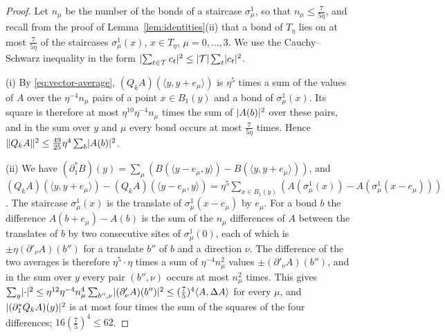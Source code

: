 \documentclass[11pt]{preprint}
\DeclarePairedDelimiter{\abs}{\lvert}{\rvert}
\DeclarePairedDelimiter{\norm}{\lVert}{\rVert}
\numberwithin{equation}{section}
\theoremstyle{definition}
\theoremstyle{remark}
\theoremstyle{plain}
\begin{document}
\begin{proof}
Let $n_\mu$ be the number of the bonds of a staircase $\sigma^1_\mu$, so that $n_\mu \leq \frac{7}{5\eta}$, and recall from the proof of Lemma~\ref{lem:identities}(ii) that a bond of $T_\eta$ lies on at most $\frac{7}{5\eta}$ of the staircases $\sigma^1_\mu(x)$, $x \in T_\eta$, $\mu = 0, \dots, 3$. We use the Cauchy--Schwarz inequality in the form $\abs{\sum_{t \in \mathcal T}c_t}^2 \leq \abs{\mathcal T}\sum_t\abs{c_t}^2$.

(i) By \eqref{eq:vector-average}, $(Q_kA)(\langle y, y + e_\mu\rangle)$ is $\eta^5$ times a sum of the values of $A$ over the $\eta^{-4}n_\mu$ pairs of a point $x \in B_1(y)$ and a bond of $\sigma^1_\mu(x)$. Its square is therefore at most $\eta^{10}\eta^{-4}n_\mu$ times the sum of $\abs{A(b)}^2$ over these pairs, and in the sum over $y$ and $\mu$ every bond occurs at most $\frac{7}{5\eta}$ times. Hence $\norm{Q_kA}^2 \leq \frac{49}{25}\eta^4\sum_b\abs{A(b)}^2$.

(ii) We have $(\partial_1^*B)(y) = \sum_\mu(B(\langle y - e_\mu, y\rangle) - B(\langle y, y + e_\mu\rangle))$, and $(Q_kA)(\langle y, y + e_\mu\rangle) - (Q_kA)(\langle y - e_\mu, y\rangle) = \eta^5\sum_{x \in B_1(y)}(A(\sigma^1_\mu(x)) - A(\sigma^1_\mu(x - e_\mu)))$. The staircase $\sigma^1_\mu(x)$ is the translate of $\sigma^1_\mu(x - e_\mu)$ by $e_\mu$. For a bond $b$ the difference $A(b + e_\mu) - A(b)$ is the sum of the $n_\mu$ differences of $A$ between the translates of $b$ by two consecutive sites of $\sigma^1_\mu(0)$, each of which is $\pm\eta(\partial'_\nu A)(b'')$ for a translate $b''$ of $b$ and a direction $\nu$. The difference of the two averages is therefore $\eta^5 \cdot \eta$ times a sum of $\eta^{-4}n_\mu^2$ values $\pm(\partial'_\nu A)(b'')$, and in the sum over $y$ every pair $(b'', \nu)$ occurs at most $n_\mu^2$ times. This gives $\sum_y\abs{\cdot}^2 \leq \eta^{12}\eta^{-4}n_\mu^4\sum_{b'',\nu}\abs{(\partial'_\nu A)(b'')}^2 \leq (\frac75)^4\langle A, \Delta A\rangle$ for every $\mu$, and $\abs{(\partial_1^*Q_kA)(y)}^2$ is at most four times the sum of the squares of the four differences; $16(\frac75)^4 \leq 62$.


\end{proof}
\end{document}
